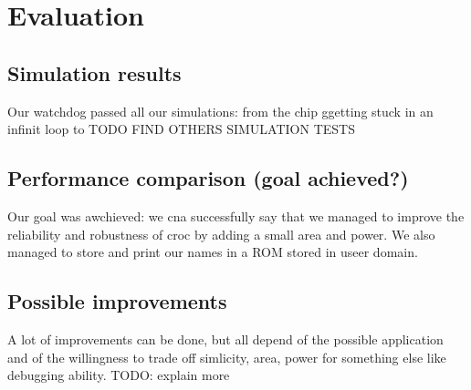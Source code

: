 

\chapter{Evaluation}

\section{Simulation results}
Our watchdog passed all our simulations: from  the chip ggetting stuck in an infinit loop to TODO FIND OTHERS SIMULATION TESTS 

\section{Performance comparison (goal achieved?)}
Our goal was awchieved: we cna successfully say that we managed to improve the reliability and robustness of croc by adding a small area and power. 
We also managed to store and print our names in a ROM stored in useer domain.

\section{Possible improvements}
A lot of improvements can be done, but all depend of the possible application and of the willingness to trade off simlicity, area, power for something else like debugging ability. 
TODO: explain more
